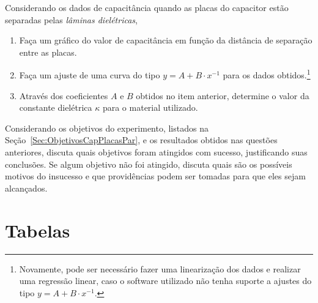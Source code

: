 \begin{question}[type={exam}]
Considerando os dados de capacitância quando as placas do capacitor estão separadas pelas \emph{lâminas dielétricas},
\begin{enumerate}[label=\roman*.]
    \item Faça um gráfico do valor de capacitância em função da distância de separação entre as placas.
    \item Faça um ajuste de uma curva do tipo $y = A + B \cdot x^{-1}$ para os dados obtidos.\footnote{Novamente, pode ser necessário fazer uma linearização dos dados e realizar uma regressão linear, caso o software utilizado não tenha suporte a ajustes do tipo $y = A + B \cdot x^{-1}$.} 
    \item Através dos coeficientes $A$ e $B$ obtidos no item anterior, determine o valor da constante dielétrica $\kappa$ para o material utilizado. 
\end{enumerate}
\end{question}

\begin{question}[type={exam}]
Considerando os objetivos do experimento, listados na Seção~\ref{Sec:ObjetivosCapPlacasPar}, e os resultados obtidos nas questões anteriores, discuta quais objetivos foram atingidos com sucesso, justificando suas conclusões. Se algum objetivo não foi atingido, discuta quais são os possíveis motivos do insucesso e que providências podem ser tomadas para que eles sejam alcançados.
\end{question}

\vfill
\pagebreak
\section{Tabelas}

